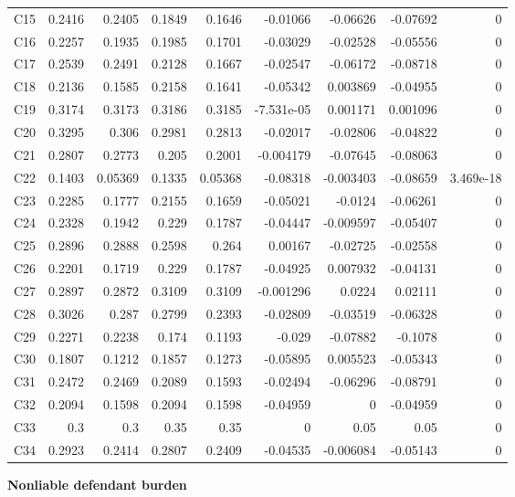 \documentclass[10pt]{article}
\begin{document}
\begin{longtable}{@{}lrrrrrrrr@{}}
C15 & 0.2416 & 0.2405 & 0.1849 & 0.1646 & -0.01066 & -0.06626 & -0.07692 & 0\\[1pt]
C16 & 0.2257 & 0.1935 & 0.1985 & 0.1701 & -0.03029 & -0.02528 & -0.05556 & 0\\[1pt]
C17 & 0.2539 & 0.2491 & 0.2128 & 0.1667 & -0.02547 & -0.06172 & -0.08718 & 0\\[1pt]
C18 & 0.2136 & 0.1585 & 0.2158 & 0.1641 & -0.05342 & 0.003869 & -0.04955 & 0\\[1pt]
C19 & 0.3174 & 0.3173 & 0.3186 & 0.3185 & -7.531e-05 & 0.001171 & 0.001096 & 0\\[1pt]
C20 & 0.3295 & 0.306 & 0.2981 & 0.2813 & -0.02017 & -0.02806 & -0.04822 & 0\\[1pt]
C21 & 0.2807 & 0.2773 & 0.205 & 0.2001 & -0.004179 & -0.07645 & -0.08063 & 0\\[1pt]
C22 & 0.1403 & 0.05369 & 0.1335 & 0.05368 & -0.08318 & -0.003403 & -0.08659 & 3.469e-18\\[1pt]
C23 & 0.2285 & 0.1777 & 0.2155 & 0.1659 & -0.05021 & -0.0124 & -0.06261 & 0\\[1pt]
C24 & 0.2328 & 0.1942 & 0.229 & 0.1787 & -0.04447 & -0.009597 & -0.05407 & 0\\[1pt]
C25 & 0.2896 & 0.2888 & 0.2598 & 0.264 & 0.00167 & -0.02725 & -0.02558 & 0\\[1pt]
C26 & 0.2201 & 0.1719 & 0.229 & 0.1787 & -0.04925 & 0.007932 & -0.04131 & 0\\[1pt]
C27 & 0.2897 & 0.2872 & 0.3109 & 0.3109 & -0.001296 & 0.0224 & 0.02111 & 0\\[1pt]
C28 & 0.3026 & 0.287 & 0.2799 & 0.2393 & -0.02809 & -0.03519 & -0.06328 & 0\\[1pt]
C29 & 0.2271 & 0.2238 & 0.174 & 0.1193 & -0.029 & -0.07882 & -0.1078 & 0\\[1pt]
C30 & 0.1807 & 0.1212 & 0.1857 & 0.1273 & -0.05895 & 0.005523 & -0.05343 & 0\\[1pt]
C31 & 0.2472 & 0.2469 & 0.2089 & 0.1593 & -0.02494 & -0.06296 & -0.08791 & 0\\[1pt]
C32 & 0.2094 & 0.1598 & 0.2094 & 0.1598 & -0.04959 & 0 & -0.04959 & 0\\[1pt]
C33 & 0.3 & 0.3 & 0.35 & 0.35 & 0 & 0.05 & 0.05 & 0\\[1pt]
C34 & 0.2923 & 0.2414 & 0.2807 & 0.2409 & -0.04535 & -0.006084 & -0.05143 & 0\\[1pt]
\end{longtable}\normalsize
\newpage
{\LARGE\bfseries Nonliable defendant burden}\par\medskip
\end{document}
